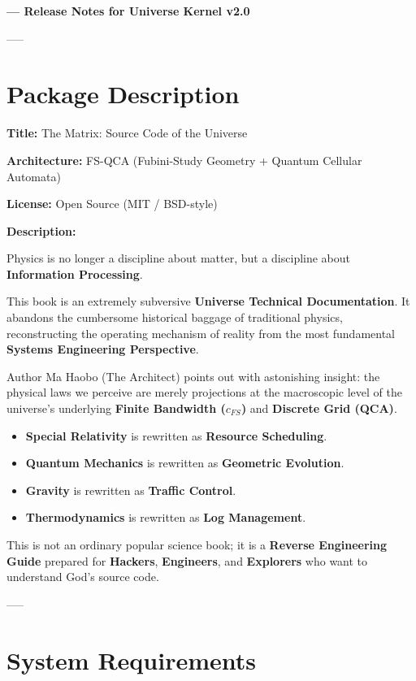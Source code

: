 \documentclass[11pt,a4paper,twoside]{book}
\begin{document}
\textbf{--- Release Notes for Universe Kernel v2.0}

-----

\section{Package Description}

\textbf{Title:} The Matrix: Source Code of the Universe

\textbf{Architecture:} FS-QCA (Fubini-Study Geometry + Quantum Cellular Automata)

\textbf{License:} Open Source (MIT / BSD-style)

\textbf{Description:}

Physics is no longer a discipline about matter, but a discipline about \textbf{Information Processing}.

This book is an extremely subversive \textbf{Universe Technical Documentation}. It abandons the cumbersome historical baggage of traditional physics, reconstructing the operating mechanism of reality from the most fundamental \textbf{Systems Engineering Perspective}.

Author Ma Haobo (The Architect) points out with astonishing insight: the physical laws we perceive are merely projections at the macroscopic level of the universe's underlying \textbf{Finite Bandwidth ($c_{FS}$)} and \textbf{Discrete Grid (QCA)}.

\begin{itemize}
\item \textbf{Special Relativity} is rewritten as \textbf{Resource Scheduling}.

\item \textbf{Quantum Mechanics} is rewritten as \textbf{Geometric Evolution}.

\item \textbf{Gravity} is rewritten as \textbf{Traffic Control}.

\item \textbf{Thermodynamics} is rewritten as \textbf{Log Management}.
\end{itemize}

This is not an ordinary popular science book; it is a \textbf{Reverse Engineering Guide} prepared for \textbf{Hackers}, \textbf{Engineers}, and \textbf{Explorers} who want to understand God's source code.

-----

\section{System Requirements}
\end{document}

